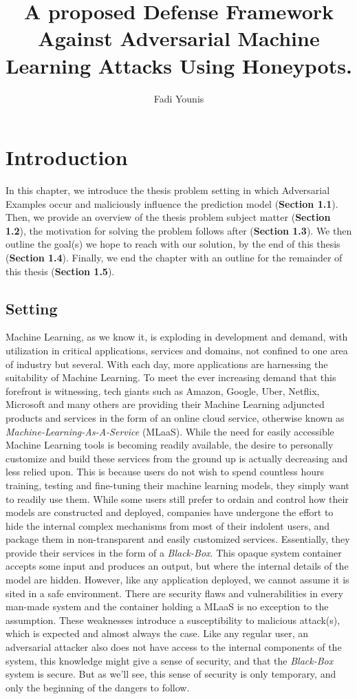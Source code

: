 \documentclass[grad,lot,lof,11pt,oneside,onehalfspace]{RUthesis}
\title{A proposed Defense Framework Against Adversarial Machine Learning Attacks Using Honeypots.}
\author{Fadi Younis}
\begin{document}
\maketitle
 
\chapter{Introduction}
 In this chapter, we introduce the thesis problem setting in which Adversarial Examples occur and maliciously influence the prediction model (\textbf{Section 1.1}). Then, we provide an overview of the thesis problem subject matter (\textbf{Section 1.2}), the motivation for solving the problem follows after (\textbf{Section 1.3}). We then outline the goal(s) we hope to reach with our solution, by the end of this thesis (\textbf{Section 1.4}). Finally, we end the chapter with an outline for the remainder of this thesis (\textbf{Section 1.5}).
\section{Setting}
  Machine Learning, as we know it,  is exploding in development and demand, with utilization in critical applications, services and domains, not confined to one area of industry but several. With each day, more applications are harnessing the suitability of Machine Learning. To meet the ever increasing demand that this forefront is witnessing, tech giants such as Amazon, Google, Uber, Netflix, Microsoft and many others are providing their Machine Learning adjuncted products and services in the form of an online cloud service, otherwise known as\textit{ Machine-Learning-As-A-Service} (MLaaS)\cite{ribeiro_mlaas:_2015}. While the need for easily accessible Machine Learning tools is becoming readily available, the desire to personally customize and build these services from the ground up is actually decreasing and less relied upon. This is because users do not wish to spend countless hours training, testing and fine-tuning their machine learning models, they simply want to readily use them. While some users still prefer to ordain and control how their models are constructed and deployed, companies have undergone the effort to hide the internal complex mechanisms from most of their indolent users, and package them in non-transparent and easily customized services. Essentially, they provide their services in the form of a \textit{Black-Box}\cite{kurakin_adversarial_2016}\cite{papernot_practical_2016}. This opaque system container accepts some input and produces an output, but where the internal details of the model are hidden. However, like any application deployed, we cannot assume it is sited in a safe environment. There are security flaws and vulnerabilities in every man-made system and the container holding a MLaaS is no exception to the assumption. These weaknesses introduce a susceptibility to malicious attack(s), which is expected and almost always the case. Like any regular user, an adversarial attacker also does not have access to the internal
  components of the system, this knowledge might give a sense of security, and that the \textit{Black-Box} system is secure. But as we’ll see, this sense of security is only temporary, and only the beginning of the dangers to follow. 
\end{document}
